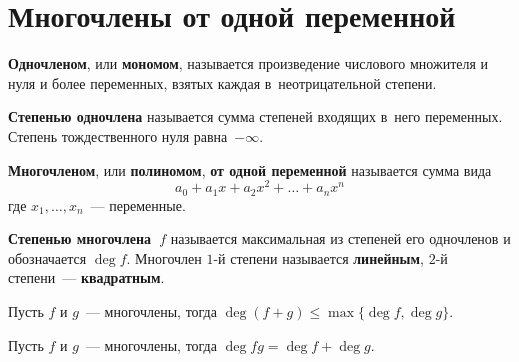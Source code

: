 \section{Многочлены от одной переменной}
 \textbf{Одночленом}, или \textbf{мономом}, называется произведение числового множителя и нуля и более переменных, взятых каждая в~неотрицательной степени.

\textbf{Степенью одночлена} называется сумма степеней входящих в~него переменных.
Степень тождественного нуля равна~$-\infty$.

 \textbf{Многочленом}, или \textbf{полиномом}, \textbf{от одной переменной} называется сумма вида
\begin{equation*}
a_0 + a_1 x + a_2 x^2 + \ldots + a_n x^n
\end{equation*}
где $x_1, \ldots, x_n$~--- переменные.

 \textbf{Степенью многочлена~$f$} называется максимальная из степеней его одночленов и обозначается $\deg f$.
Многочлен $1$\nobreakdash-й степени называется \textbf{линейным}, $2$\nobreakdash-й степени~--- \textbf{квадратным}.

\begin{statement}
Пусть $f$ и $g$~--- многочлены, тогда $\deg (f + g) \leqslant \max \{ \deg f, \deg g \}$.
\end{statement}
\begin{statement}
Пусть $f$ и $g$~--- многочлены, тогда $\deg fg = \deg f + \deg g$.
\end{statement}